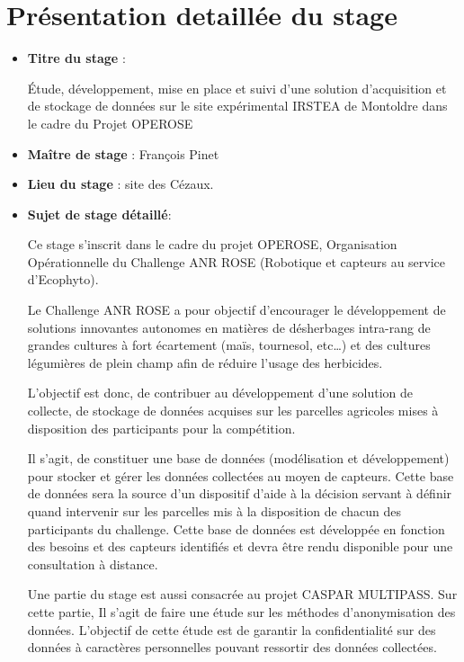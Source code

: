 \chapter{Présentation detaillée du stage}

\begin{itemize}

 \item \textbf{Titre du stage} :

 Étude, développement, mise en place  et suivi d'une solution d'acquisition et de stockage de données sur le site expérimental IRSTEA de Montoldre dans le cadre du Projet OPEROSE
 \item \textbf{Maître de stage} : François Pinet
 \item \textbf{Lieu du stage} : site des Cézaux.

\item \textbf{Sujet de stage détaillé}: 

Ce stage s’inscrit dans le cadre du projet OPEROSE, Organisation Opérationnelle du Challenge ANR ROSE (Robotique et capteurs au service d’Ecophyto). 

Le Challenge ANR ROSE a pour objectif d’encourager le développement de solutions innovantes autonomes en matières de désherbages intra-rang de grandes cultures à fort écartement (maïs, tournesol, etc…) et des cultures légumières de plein champ afin de réduire l’usage des herbicides.

L’objectif est donc, de contribuer au développement d’une solution de collecte, de stockage de données acquises sur les parcelles agricoles mises à disposition des participants pour la compétition.

Il s’agit, de constituer une base de données (modélisation et développement) pour stocker et gérer les données collectées au moyen de capteurs. Cette base de données sera la source d’un dispositif d’aide à la décision servant à définir quand intervenir sur les parcelles mis à la disposition de chacun des participants du challenge. Cette base de données est développée en fonction des besoins et des capteurs identifiés et devra être rendu disponible pour une consultation à distance.

Une partie du stage est aussi consacrée au projet CASPAR MULTIPASS. Sur cette partie, Il s’agit de faire une étude sur les méthodes d’anonymisation des données. L’objectif de cette étude est de garantir la confidentialité sur des données à caractères personnelles pouvant ressortir des données collectées.

\end{itemize}

